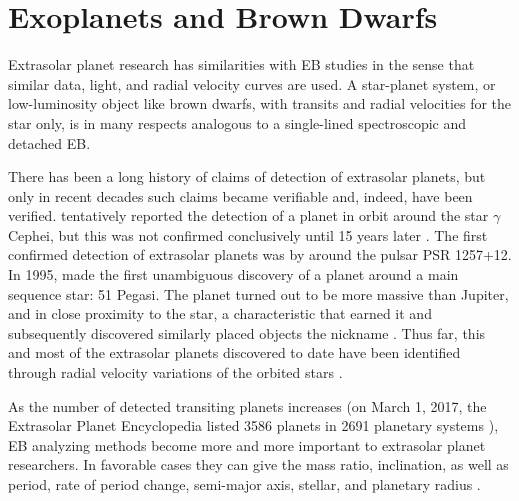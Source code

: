 \chapter{Exoplanets and Brown Dwarfs}
\label{ch:exo}
Extrasolar planet research has similarities with EB studies in the sense that similar data, 
light, and radial velocity curves are used. A star-planet system, or low-luminosity object like brown dwarfs, 
with transits and radial velocities for the star only, is in many respects analogous to a single-lined spectroscopic and detached EB.

There has been a long history of claims of detection of extrasolar planets, but only in recent 
decades such claims became verifiable and, indeed, have been verified. 
\cite{Campbell1988} tentatively reported the detection of a planet in orbit around the star $\gamma$
Cephei, but this was not confirmed conclusively until 15 years later \citep{hatzes2003}. 
The first confirmed detection of extrasolar planets was by \cite{wolszczan1992} 
around the pulsar PSR 1257+12. In 1995, \cite{Mayor1995} made the
first unambiguous discovery of a planet around a main sequence star: 51 Pegasi. The
planet turned out to be more massive than Jupiter, and in close proximity to the star, a
characteristic that earned it and subsequently discovered similarly placed objects the
nickname . Thus far, this and most of the extrasolar planets discovered
to date have been identified through radial velocity variations of the orbited stars \citep{kallrath2009eclipsing}.

As the number of detected transiting planets increases (on March 1, 2017, the Extrasolar
Planet Encyclopedia listed 3586 planets in 2691 planetary systems \citep{exoplanetwebsite}), EB analyzing methods become
more and more important to extrasolar planet researchers. In favorable cases they
can give the mass ratio, inclination, as well as period, rate of period change, semi-major axis, 
stellar, and planetary radius \citep{kallrath2009eclipsing}.

